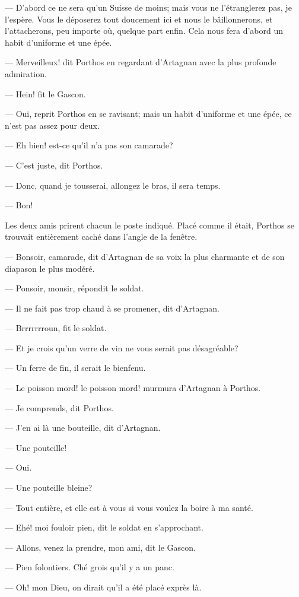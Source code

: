 — D'abord ce ne sera qu'un Suisse de moins; mais vous ne l'étranglerez pas, je l'espère. Vous le déposerez tout doucement ici et nous le bâillonnerons, et l'attacherons, peu importe où, quelque part enfin. Cela nous fera d'abord un habit d'uniforme et une épée.

— Merveilleux! dit Porthos en regardant d'Artagnan avec la plus profonde admiration.

— Hein! fit le Gascon.

— Oui, reprit Porthos en se ravisant; mais un habit d'uniforme et une épée, ce n'est pas assez pour deux.

— Eh bien! est-ce qu'il n'a pas son camarade?

— C'est juste, dit Porthos.

— Donc, quand je tousserai, allongez le bras, il sera temps.

— Bon!

Les deux amis prirent chacun le poste indiqué. Placé comme il était, Porthos se trouvait entièrement caché dans l'angle de la fenêtre.

— Bonsoir, camarade, dit d'Artagnan de sa voix la plus charmante et de son diapason le plus modéré.

— Ponsoir, monsir, répondit le soldat.

— Il ne fait pas trop chaud à se promener, dit d'Artagnan.

— Brrrrrrroun, fit le soldat.

— Et je crois qu'un verre de vin ne vous serait pas désagréable?

— Un ferre de fin, il serait le bienfenu.

— Le poisson mord! le poisson mord! murmura d'Artagnan à Porthos.

— Je comprends, dit Porthos.

— J'en ai là une bouteille, dit d'Artagnan.

— Une pouteille!

— Oui.

— Une pouteille bleine?

— Tout entière, et elle est à vous si vous voulez la boire à ma santé.

— Ehé! moi fouloir pien, dit le soldat en s'approchant.

— Allons, venez la prendre, mon ami, dit le Gascon.

— Pien folontiers. Ché grois qu'il y a un panc.

— Oh! mon Dieu, on dirait qu'il a été placé exprès là.

